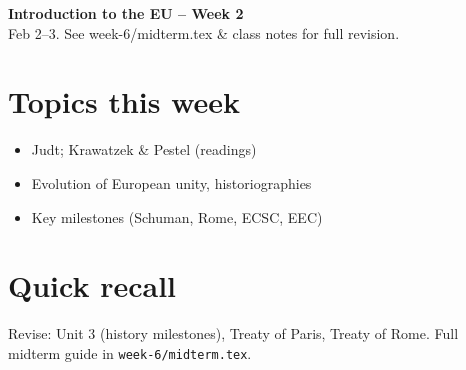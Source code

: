 \documentclass[10pt,a4paper]{article}
\begin{document}
\begin{center}
{\large\bfseries\color{eublue} Introduction to the EU -- Week 2}\\[0.2em]
\footnotesize Feb 2--3. See week-6/midterm.tex \& class notes for full revision.
\end{center}\vspace{0.5em}

\section*{\color{eublue}Topics this week}
\begin{itemize}
\item Judt; Krawatzek \& Pestel (readings)
\item Evolution of European unity, historiographies
\item Key milestones (Schuman, Rome, ECSC, EEC)
\end{itemize}

\section*{Quick recall}
Revise: Unit 3 (history milestones), Treaty of Paris, Treaty of Rome. Full midterm guide in \texttt{week-6/midterm.tex}.
\end{document}
